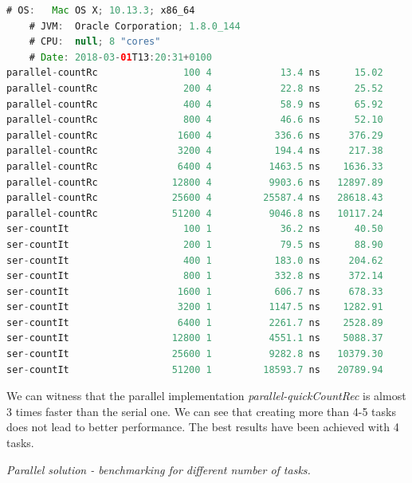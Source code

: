 \documentclass[format=acmsmall, review=false, screen=true]{acmart}
\begin{document}
\begin{lstlisting}[language=java]
	# OS:   Mac OS X; 10.13.3; x86_64
	# JVM:  Oracle Corporation; 1.8.0_144
	# CPU:  null; 8 "cores"
	# Date: 2018-03-01T13:20:31+0100
parallel-countRc               100 4            13.4 ns      15.02       1024
parallel-countRc               200 4            22.8 ns      25.52        512
parallel-countRc               400 4            58.9 ns      65.92        256
parallel-countRc               800 4            46.6 ns      52.10        256
parallel-countRc              1600 4           336.6 ns     376.29         32
parallel-countRc              3200 4           194.4 ns     217.38         64
parallel-countRc              6400 4          1463.5 ns    1636.33          8
parallel-countRc             12800 4          9903.6 ns   12897.89          2
parallel-countRc             25600 4         25587.4 ns   28618.43          2
parallel-countRc             51200 4          9046.8 ns   10117.24          2
ser-countIt                    100 1            36.2 ns      40.50     524288
ser-countIt                    200 1            79.5 ns      88.90      65536
ser-countIt                    400 1           183.0 ns     204.62      16384
ser-countIt                    800 1           332.8 ns     372.14       4096
ser-countIt                   1600 1           606.7 ns     678.33       2048
ser-countIt                   3200 1          1147.5 ns    1282.91        512
ser-countIt                   6400 1          2261.7 ns    2528.89        128
ser-countIt                  12800 1          4551.1 ns    5088.37         32
ser-countIt                  25600 1          9282.8 ns   10379.30          8
ser-countIt                  51200 1         18593.7 ns   20789.94          2
\end{lstlisting}

We can witness that the parallel implementation \textit{parallel-quickCountRec} is almost 3 times faster than the serial one. We can see that creating more than 4-5 tasks does not lead to better performance. The best results have been achieved with 4 tasks. 

\textit{Parallel solution - benchmarking for different number of tasks.}
\end{document}
